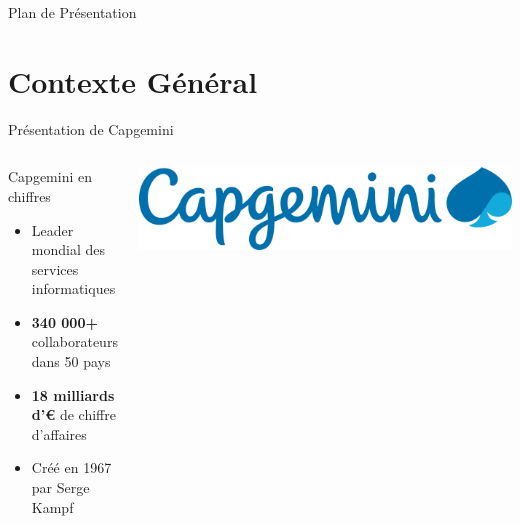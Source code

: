 \documentclass[aspectratio=169]{beamer}
\begin{document}
\begin{frame}[plain]
\begin{center}
    \end{center}
\end{frame}%
\begin{frame}{Plan de Présentation}
    \tableofcontents
\end{frame}

\section{Contexte Général}

\begin{frame}{Présentation de Capgemini}
    \begin{columns}
        \begin{block}{Capgemini en chiffres}
            \begin{itemize}
                \item Leader mondial des services informatiques
                \item \textbf{340 000+} collaborateurs dans 50 pays
                \item \textbf{18 milliards d'€} de chiffre d'affaires
                \item Créé en 1967 par Serge Kampf
            \end{itemize}
        \end{block}

        \begin{center}
            \includegraphics[width=\textwidth]{latex_media/media/image3.png}
        \end{center}
    \end{columns}
\end{frame}
\end{document}
